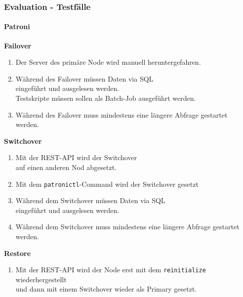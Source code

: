 
\begin{flushleft}
    \subsubsection{Evaluation - Testfälle}
    \paragraph{Patroni}
    \begin{description}
        \item \textbf{Failover}\hfill \\
        \begin{enumerate}
            \item Der Server des primäre Node wird manuell heruntergefahren.
            \item Während des Failover müssen Daten via SQL\\eingeführt und ausgelesen werden.\\Testskripte müssen sollen als Batch-Job ausgeführt werden.
            \item Während des Failover muss mindestens eine längere Abfrage gestartet werden.
        \end{enumerate}
        \item \textbf{Switchover}\hfill \\
        \begin{enumerate}[resume]
            \item Mit der REST-API wird der Switchover\\auf einen anderen Nod abgesetzt.
            \item Mit dem \texttt{patronictl}-Command wird der Switchover gesetzt
            \item Während dem Switchover müssen Daten via SQL\\eingeführt und ausgelesen werden.
            \item Während dem Switchover muss mindestens eine längere Abfrage gestartet werden.
        \end{enumerate}
        \item \textbf{Restore}\hfill \\
        \begin{enumerate}[resume]
            \item Mit der REST-API wird der Node erst mit dem \texttt{reinitialize} wiederhergestellt\\und dann mit einem Switchover wieder als Primary gesetzt.

\end{enumerate}
\end{description}
\end{flushleft}
